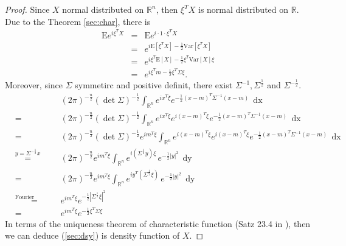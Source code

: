 \documentclass[a4paper, twoside, 11pt]{article}
\theoremstyle{definition}
\newcommand{\sqbr}[1]{\left[ {#1} \right]}
\begin{document}
\begin{proof}
  Since $X$ normal distributed on $\mathbb{R}^{n}$, then $\xi^T X$ is normal distributed on $\mathbb{R}$. Due to the Theorem \ref{sec:char}, there is
  \begin{eqnarray*}
	\mathrm{E} e^{i\xi^T X} &=& \mathrm{E} e^{i\cdot 1 \cdot \xi^T X}\\
	                        &=& e^{i\mathrm{E}\sqbr{\xi^T X} -\frac{1}{2}\mathrm{Var}\sqbr{\xi^T X}}\\
							&=& e^{i\xi^T\mathrm{E}\sqbr{X} - \frac{1}{2}\xi^T \mathrm{Var}\sqbr{X} \xi}\\
						    &=& e^{i\xi^Tm - \frac{1}{2}\xi^T \Sigma \xi}.
  \end{eqnarray*}
  Moreover, since $\Sigma$ symmetirc and positive definit, there exist $\Sigma^{-1}, \Sigma^{\frac{1}{2}}$ and $\Sigma^{-\frac{1}{2}}$.
  \begin{eqnarray*}
	&&(2\pi)^{-\frac{n}{2}} (\det\Sigma) ^{-\frac{1}{2}}\int_{\mathbb{R}^{n}} e^{i x^T \xi}e^{-\frac{1}{2}(x-m)^T\Sigma^{-1}(x-m)}\, \mathop{dx}\\
	&=& (2\pi)^{-\frac{n}{2}} (\det\Sigma) ^{-\frac{1}{2}}\int_{\mathbb{R}^{n}} e^{ix^T\xi} e^{i (x-m)^T \xi}e^{-\frac{1}{2}(x-m)^T\Sigma^{-1}(x-m)}\, \mathop{dx} \\
	&=& (2\pi)^{-\frac{n}{2}} (\det\Sigma) ^{-\frac{1}{2}}  e^{im^T\xi} \int_{\mathbb{R}^{n}} e^{i(x-m)^T\xi} e^{i (x-m)^T \xi}e^{-\frac{1}{2}(x-m)^T\Sigma^{-1}(x-m)}\, \mathop{dx} \\
	&\overset{y=\Sigma^{-\frac{1}{2}}x}{=}& (2\pi)^{-\frac{n}{2}} e^{im^T\xi} \int_{\mathbb{R}^{n}}e^{i (\Sigma^{\frac{1}{2}}y) \xi}\,e^{-\frac{1}{2}|y|^2}\, \mathop{dy}\\
	&=& (2\pi)^{-\frac{n}{2}} e^{im^T\xi}  \int_{\mathbb{R}^{n}}e^{i y^T (\Sigma^{\frac{1}{2}}\xi)}\,e^{-\frac{1}{2}|y|^2}\, \mathop{dy}\\
	&\overset{\text{Fourier transformation}}{=}& e^{im^T\xi}  e^{-\frac{1}{2}|\Sigma^{\frac{1}{2}}\xi|^2}\\
	&=& e^{im^T\xi}  e^{-\frac{1}{2}\xi^T\Sigma\xi}
  \end{eqnarray*}
  In terms of the uniqueness theorem of characteristic function (Satz 23.4 in \cite{bauer}), then we can deduce (\ref{sec:dsy}) is density function of $X$.
\end{proof}
\end{document}
